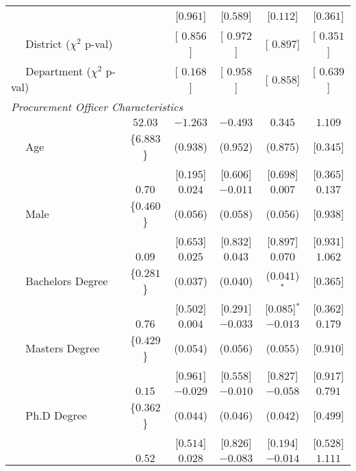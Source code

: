 \begin{longtable}{lccccc}
 & & [$    0.961$]  & [$    0.589$]  & [$    0.112$]  & [$    0.361$]  \\ [0.5em] 
 $\quad$ District ($\chi^{2}$ p-val) &  & [ $    0.856$]  & [ $    0.972$]  & [ $    0.897$]  & [ $    0.351$]  \\ [0.5em]
 $\quad$ Department ($\chi^{2}$ p-val) &  & [ $    0.168$]  & [ $    0.958$]  & [ $    0.858$]  & [ $    0.639$]  \\ [0.5em]
 \multicolumn{6}{l}{\textit{Procurement Officer Characteristics}} \\ 
 & $    52.03$ & $   -1.263$ & $   -0.493$ & $    0.345$ & $    1.109$ \\ 
 $\quad$ Age  & \{$    6.883$\}  & ($    0.938$)  & ($    0.952$)  & ($    0.875$)  & [$    0.345$]  \\ 
 & & [$    0.195$]  & [$    0.606$]  & [$    0.698$]  & [$    0.365$]  \\ [0.5em] 
 & $     0.70$ & $    0.024$ & $   -0.011$ & $    0.007$ & $    0.137$ \\ 
 $\quad$ Male  & \{$    0.460$\}  & ($    0.056$)  & ($    0.058$)  & ($    0.056$)  & [$    0.938$]  \\ 
 & & [$    0.653$]  & [$    0.832$]  & [$    0.897$]  & [$    0.931$]  \\ [0.5em] 
 & $     0.09$ & $    0.025$ & $    0.043$ & $    0.070$ & $    1.062$ \\ 
 $\quad$ Bachelors Degree  & \{$    0.281$\}  & ($    0.037$)  & ($    0.040$)  & ($    0.041$)$^{*}$ & [$    0.365$]  \\ 
 & & [$    0.502$]  & [$    0.291$]  & [$    0.085$]$^{*}$ & [$    0.362$]  \\ [0.5em] 
 & $     0.76$ & $    0.004$ & $   -0.033$ & $   -0.013$ & $    0.179$ \\ 
 $\quad$ Masters Degree  & \{$    0.429$\}  & ($    0.054$)  & ($    0.056$)  & ($    0.055$)  & [$    0.910$]  \\ 
 & & [$    0.961$]  & [$    0.558$]  & [$    0.827$]  & [$    0.917$]  \\ [0.5em] 
 & $     0.15$ & $   -0.029$ & $   -0.010$ & $   -0.058$ & $    0.791$ \\ 
 $\quad$ Ph.D Degree  & \{$    0.362$\}  & ($    0.044$)  & ($    0.046$)  & ($    0.042$)  & [$    0.499$]  \\ 
 & & [$    0.514$]  & [$    0.826$]  & [$    0.194$]  & [$    0.528$]  \\ [0.5em] 
 & $     0.52$ & $    0.028$ & $   -0.083$ & $   -0.014$ & $    1.111$ \\ 

\end{longtable}
